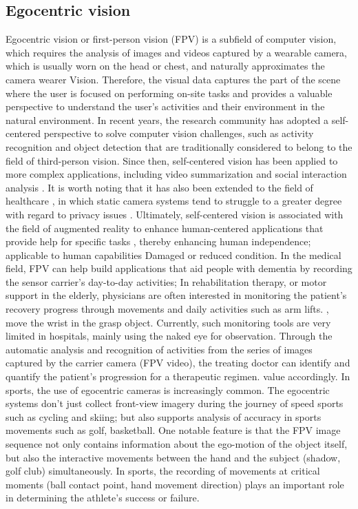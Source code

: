 \subsection{Egocentric vision}
Egocentric vision or first-person vision (FPV) is a subfield of computer vision, which requires the analysis of images and videos captured by a wearable camera, which is usually worn on the head or chest, and naturally approximates the camera wearer Vision. Therefore, the visual data captures the part of the scene where the user is focused on performing on-site tasks and provides a valuable perspective to understand the user's activities and their environment in the natural environment.
In recent years, the research community has adopted a self-centered perspective to solve computer vision challenges, such as activity recognition \cite{10.1109/ICCV.2011.6126269} and object detection \cite{5995444} that are traditionally considered to belong to the field of third-person vision. Since then, self-centered vision has been applied to more complex applications, including video summarization \cite{6247820} and social interaction analysis \cite{7780657}. It is worth noting that it has also been extended to the field of healthcare \cite{wearable}, in which static camera systems tend to struggle to a greater degree with regard to privacy issues \cite{6091176}. Ultimately, self-centered vision is associated with the field of augmented reality to enhance human-centered applications that provide help for specific tasks \cite{10.1145/3041164.3041185}, thereby enhancing human independence; applicable to human capabilities Damaged or reduced condition.
In the medical field, FPV can help build applications that aid people with dementia by recording the sensor carrier's day-to-day activities; In rehabilitation therapy, or motor support in the elderly, physicians are often interested in monitoring the patient's recovery progress through movements and daily activities such as arm lifts. , move the wrist in the grasp object. Currently, such monitoring tools are very limited in hospitals, mainly using the naked eye for observation. Through the automatic analysis and recognition of activities from the series of images captured by the carrier camera (FPV video), the treating doctor can identify and quantify the patient's progression for a therapeutic regimen. value accordingly.
In sports, the use of egocentric cameras is increasingly common. The egocentric systems don't just collect front-view imagery during the journey of speed sports such as cycling and skiing; but also supports analysis of accuracy in sports movements such as golf, basketball. One notable feature is that the FPV image sequence not only contains information about the ego-motion of the object itself, but also the interactive movements between the hand and the subject (shadow, golf club) simultaneously. In sports, the recording of movements at critical moments (ball contact point, hand movement direction) plays an important role in determining the athlete's success or failure.
